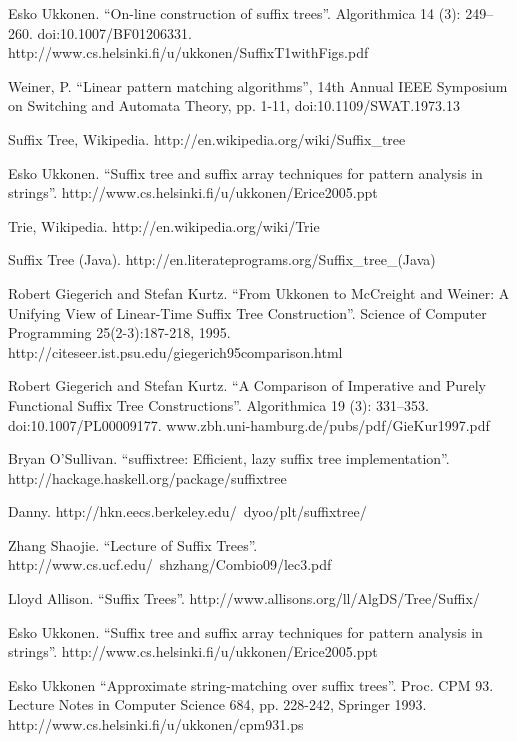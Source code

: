 \documentclass[UTF8]{article}
\begin{document}
\begin{thebibliography}{99}

Esko Ukkonen. ``On-line construction of suffix trees''. Algorithmica 14 (3): 249--260. doi:10.1007/BF01206331. http://www.cs.helsinki.fi/u/ukkonen/SuffixT1withFigs.pdf

Weiner, P. ``Linear pattern matching algorithms'', 14th Annual IEEE Symposium on Switching and Automata Theory, pp. 1-11, doi:10.1109/SWAT.1973.13

Suffix Tree, Wikipedia. http://en.wikipedia.org/wiki/Suffix\_tree

Esko Ukkonen. ``Suffix tree and suffix array techniques for pattern analysis in strings''. http://www.cs.helsinki.fi/u/ukkonen/Erice2005.ppt

Trie, Wikipedia. http://en.wikipedia.org/wiki/Trie

Suffix Tree (Java). http://en.literateprograms.org/Suffix\_tree\_(Java)

Robert Giegerich and Stefan Kurtz. ``From Ukkonen to McCreight and Weiner: A Unifying View of Linear-Time Suffix Tree Construction''. Science of Computer Programming 25(2-3):187-218, 1995. http://citeseer.ist.psu.edu/giegerich95comparison.html

Robert Giegerich and Stefan Kurtz. ``A Comparison of Imperative and Purely Functional Suffix Tree Constructions''. Algorithmica 19 (3): 331--353. doi:10.1007/PL00009177. www.zbh.uni-hamburg.de/pubs/pdf/GieKur1997.pdf

Bryan O'Sullivan. ``suffixtree: Efficient, lazy suffix tree implementation''. http://hackage.haskell.org/package/suffixtree

Danny. http://hkn.eecs.berkeley.edu/~dyoo/plt/suffixtree/

Zhang Shaojie. ``Lecture of Suffix Trees''. http://www.cs.ucf.edu/~shzhang/Combio09/lec3.pdf

Lloyd Allison. ``Suffix Trees''. http://www.allisons.org/ll/AlgDS/Tree/Suffix/

Esko Ukkonen. ``Suffix tree and suffix array techniques for pattern analysis in strings''. http://www.cs.helsinki.fi/u/ukkonen/Erice2005.ppt

Esko Ukkonen ``Approximate string-matching over suffix trees''. Proc. CPM 93. Lecture Notes in Computer Science 684, pp. 228-242, Springer 1993. http://www.cs.helsinki.fi/u/ukkonen/cpm931.ps

\end{thebibliography}

\ifx\wholebook\relax \else
\end{document}
